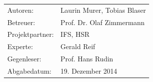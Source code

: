 \begin{titlepage}
	\vspace{80pt}	
	
	\begin{minipage}[b]{0.4\textwidth}
		\begin{flushleft}
			\begin{tabular}{ll}  
				Autoren: & Laurin Murer, Tobias Blaser \\ 
				Betreuer: & Prof. Dr. Olaf Zimmermann\\ 
				Projektpartner: & IFS, HSR\\
				Experte: & Gerald Reif\\
				Gegenleser: & Prof. Hans Rudin\\
				Abgabedatum: & 19. Dezember 2014\\
			\end{tabular}
		\end{flushleft}
	\end{minipage}	
\end{titlepage}
